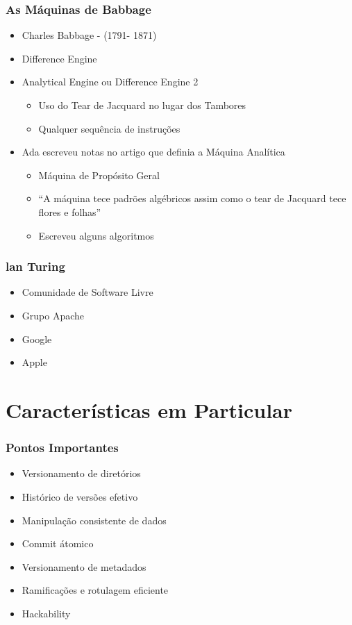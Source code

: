 \documentclass{beamer}
\begin{document}
\begin{frame}
    \frametitle{As M\'aquinas de Babbage}
    \begin{itemize}
        \item Charles Babbage - (1791- 1871)
        \item Difference Engine
        \item Analytical Engine ou Difference Engine 2
            \begin{itemize}
                \item Uso do Tear de Jacquard no lugar dos Tambores
                \item Qualquer sequ\^encia de instru\c{c}\~oes
            \end{itemize}
        \item Ada escreveu notas no artigo que definia a M\'aquina Anal\'itica
            \begin{itemize}
                \item M\'aquina de Prop\'osito Geral
                \item ``A m\'aquina tece padr\~oes alg\'ebricos assim como o tear de Jacquard tece flores e folhas''
                \item Escreveu alguns algoritmos
            \end{itemize}
    \end{itemize}
\end{frame}

\begin{frame}
    \frametitle{lan Turing}
    \begin{itemize}
        \item Comunidade de Software Livre
        \item Grupo Apache
        \item Google
        \item Apple
    \end{itemize}
\end{frame}

\section{Caracter\'isticas em Particular}
\begin{frame}
    \frametitle{Pontos Importantes}
    \begin{itemize}
        \item Versionamento de diretórios
        \item Histórico de versões efetivo
        \item Manipulação consistente de dados
        \item Commit \'atomico
        \item Versionamento de metadados
        \item Ramificações e rotulagem eficiente
        \item Hackability
    \end{itemize}
\end{frame}
\end{document}

